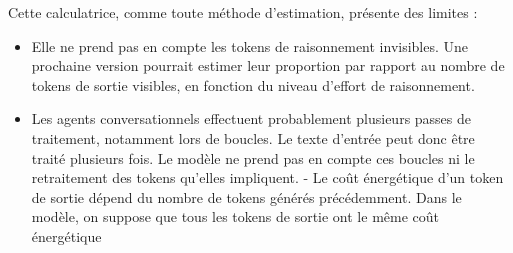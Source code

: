Cette calculatrice, comme toute méthode d’estimation, présente des limites :
\begin{itemize}
\item Elle ne prend pas en compte les tokens de raisonnement invisibles. Une prochaine version pourrait estimer leur proportion par rapport au nombre de tokens de sortie visibles, en fonction du niveau d’effort de raisonnement.
\item Les agents conversationnels effectuent probablement plusieurs passes de traitement, notamment lors de boucles. Le texte d’entrée peut donc être traité plusieurs fois. Le modèle ne prend pas en compte ces boucles ni le retraitement des tokens qu’elles impliquent.
- Le coût énergétique d'un token de sortie dépend du nombre de tokens générés précédemment. Dans le modèle, on suppose que tous les tokens de sortie ont le même coût énergétique
\end{itemize}

